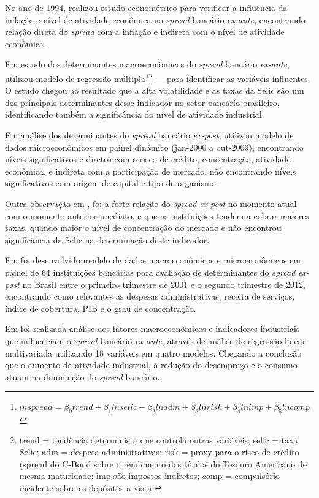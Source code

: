 \documentclass[
  12pt,
  12pt,
  openright,
  oneside,
  a4paper,
  chapter=TITLE,
  section=TITLE,
  subsection=TITLE,
  subsubsection=TITLE,
  english,
  portugues,
  sumario=tradicional]{abntex2}
\begin{document}
No ano de 1994, \textcite{aronovich:1994} realizou estudo econométrico para
verificar a influência da inflação e nível de atividade econômica no \emph{spread}
bancário \emph{ex-ante}, encontrando relação direta do \emph{spread} com a inflação e
indireta com o nível de atividade econômica.

Em estudo dos determinantes macroeconômicos do \emph{spread} bancário \emph{ex-ante}, \textcite{oreiro-2006} utilizou modelo de regressão múltipla\footnote{$ln spread = \beta_0 trend + \beta_1 ln selic + \beta_2 ln adm + \beta_3 ln risk + \beta_4 ln imp + \beta_5 ln comp$}\footnote{trend = tendência determinista que controla outras variáveis; selic = taxa Selic; adm = despesa administrativas; risk =  proxy para o risco de crédito (spread do C-Bond sobre o rendimento dos títulos do Tesouro Americano de mesma maturidade; imp são impostos indiretos; comp = compulsório incidente sobre os depósitos a vista.} --- para identificar as variáveis influentes. O estudo chegou ao resultado que a alta volatilidade e as taxas da Selic são um dos principais determinantes desse indicador no setor bancário brasileiro, identificando também a significância do nível de atividade industrial.

Em análise dos determinantes do \emph{spread} bancário \emph{ex-post}, \textcite{dantas:2012} utilizou modelo de dados microeconômicos em painel dinâmico (jan-2000 a out-2009), encontrando níveis significativos e diretos com o risco de crédito, concentração, atividade econômica, e indireta com a participação de mercado, não encontrando níveis significativos com origem de capital e tipo de organismo.

Outra observação em \textcite{dantas:2012}, foi a forte relação do \emph{spread} \emph{ex-post} no momento atual com o momento anterior imediato, e que as instituições tendem a cobrar maiores taxas, quando maior o nível de concentração do mercado e não encontrou significância da Selic na determinação deste indicador.

Em \textcite{almeida:2013} foi desenvolvido modelo de dados macroeconômicos e microeconômicos em painel de 64 instituições bancárias para avaliação de determinantes do \emph{spread} \emph{ex-post} no Brasil entre o primeiro trimestre de 2001 e o segundo trimestre de 2012, encontrando como relevantes as despesas administrativas, receita de serviços, índice de cobertura, PIB e o grau de concentração.

Em \textcite{durigan:2018} foi realizada análise dos fatores macroeconômicos e indicadores industriais que influenciam o \emph{spread} bancário \emph{ex-ante}, através de análise de regressão linear multivariada utilizando 18 variáveis em quatro modelos. Chegando a conclusão que o aumento da atividade industrial, a redução
do desemprego e o consumo atuam na diminuição do \emph{spread} bancário.
\end{document}

